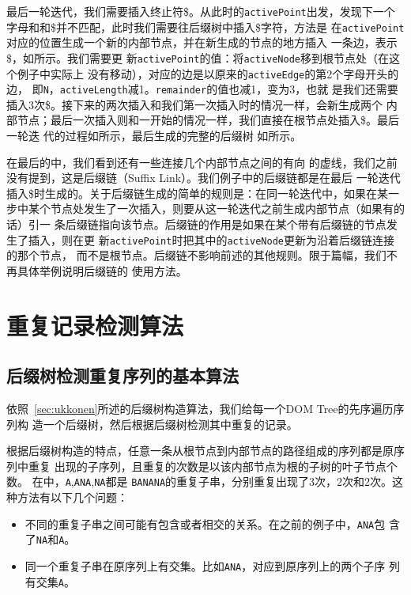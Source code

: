 最后一轮迭代，我们需要插入终止符\$。从此时的\texttt{activePoint}出发，发现下一个
字母和和\$并不匹配，此时我们需要往后缀树中插入\$字符，方法是
在\texttt{activePoint}对应的位置生成一个新的内部节点，并在新生成的节点的地方插入
一条边，表示\$，如所示。我们需要更
新\texttt{activePoint}的值：将\texttt{activeNode}移到根节点处（在这个例子中实际上
没有移动），对应的边是以原来的\texttt{activeEdge}的第2个字母开头的边，
即\texttt{N}，\texttt{activeLength}减1。\texttt{remainder}的值也减1，变为3，也就
是我们还需要插入3次\$。接下来的两次插入和我们第一次插入时的情况一样，会新生成两个
内部节点；最后一次插入则和一开始的情况一样，我们直接在根节点处插入\$。最后一轮迭
代的过程如所示，最后生成的完整的后缀树
如所示。

在最后的中，我们看到还有一些连接几个内部节点之间的有向
的虚线，我们之前没有提到，这是后缀链（Suffix Link）。我们例子中的后缀链都是在最后
一轮迭代插入\$时生成的。关于后缀链生成的简单的规则是：在同一轮迭代中，如果在某一
步中某个节点处发生了一次插入，则要从这一轮迭代之前生成内部节点（如果有的话）引一
条后缀链指向该节点。后缀链的作用是如果在某个带有后缀链的节点发生了插入，则在更
新\texttt{activePoint}时把其中的\texttt{activeNode}更新为沿着后缀链连接的那个节点，
而不是根节点。后缀链不影响前述的其他规则。限于篇幅，我们不再具体举例说明后缀链的
使用方法。

\section{重复记录检测算法}
\label{sec:multipldetect}

\subsection{后缀树检测重复序列的基本算法}
依照~\ref{sec:ukkonen}所述的后缀树构造算法，我们给每一个DOM Tree的先序遍历序列构
造一个后缀树，然后根据后缀树检测其中重复的记录。

根据后缀树构造的特点，任意一条从根节点到内部节点的路径组成的序列都是原序列中重复
出现的子序列，且重复的次数是以该内部节点为根的子树的叶子节点个数。
在中，\texttt{A},\texttt{ANA},\texttt{NA}都是
\texttt{BANANA}的重复子串，分别重复出现了3次，2次和2次。这种方法有以下几个问题：
\begin{itemize}
\item 不同的重复子串之间可能有包含或者相交的关系。在之前的例子中，\texttt{ANA}包
  含了\texttt{NA}和\texttt{A}。
\item 同一个重复子串在原序列上有交集。比如\texttt{ANA}，对应到原序列上的两个子序
  列有交集\texttt{A}。  
\end{itemize}

